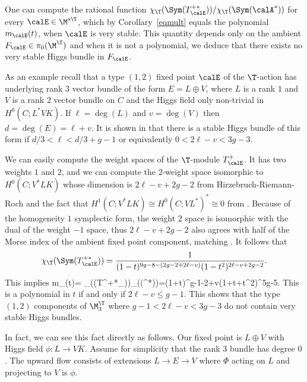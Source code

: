 \begin{remark}
\notready \label{counter}
	One can compute  the rational function ${{ \chi_\T(\Sym(T^{+*}_\calE))/ \chi_\T(\Sym(\calA^*))}}$ for every $\calE\in \M^{s\T}$, which by
	Corollary~\ref{eqmult} equals the polynomial $m_{\calE}(t)$, when $\calE$ is very stable. This quantity depends only on the ambient $F_\calE\in \pi_0(\M^\T)$ and when it is not a polynomial, we  deduce that there exists no very stable Higgs bundle in $F_\calE$.

	As an example recall \cite{gothen} that a type $(1,2)$ fixed point $\calE$ of the $\T$-action has underlying rank $3$ vector bundle of the form $E=L\oplus V$, where $L$ is a rank $1$ and $V$ is a rank $2$ vector bundle on $C$ and
	the Higgs field only non-trivial in $H^0(C;L^{*}VK)$. If $\ell=\deg(L)$ and $v=\deg(V)$ then $d=\deg(E)=\ell+v$. It is shown in \cite[Proposition 2.5]{gothen} that there is a stable Higgs bundle of this form if $ d/3<\ell<d/3+g-1$ or equivalently $0<2\ell-v<3g-3$.

	We can easily compute the weight spaces of the $\T$-module
	$T^+_\calE$. It has two weights $1$ and $2$, and we can compute the $2$-weight space isomorphic to $H^0(C;V^*LK)$ whose dimension is $2\ell-v+2g-2$ from Hirzebruch-Riemann-Roch and the fact that $H^1(C;V^*LK)\cong H^0(C;VL^*)^*\cong 0$ from \cite[proof of Proposition 4.2]{gothen}. Because of the homogeneity $1$ symplectic form,  the weight $2$ space is isomorphic with the dual of the weight $-1$ space, thus $2\ell-v+2g-2$ also agrees with half of the Morse index of the ambient fixed point component, matching \cite[Proposition 4.2.i]{gothen}. It follows that  $$\chi_\T(\Sym(T_\calE^{+*}))={1\over(1-t)^{9g-8-(2g-2+2\ell-v)}(1-t^2)^{2\ell-v+2g-2}}.$$ This implies \beq \label{nonpol}m_\calE(t)={{ \chi_\T(\Sym(T^{+*}_\calE))\over \chi_\T(\Sym(\calA^*))}}=(1+t)^{g-1-2\ell+v}(1+t+t^2)^{5g-5}.\eeq
{}
	This is a polynomial in $t$  if and only if  $2\ell-v\leq g-1$. This shows that the type $(1,2)$ components of $
	\M_3^\T$ where $g-1<2\ell-v<3g-3$ do not contain very stable Higgs bundles.

	In fact, we can see this fact directly as follows. Our fixed point is $L\oplus V$ with Higgs field $\phi:L\rightarrow VK$. Assume for simplicity that the rank $3$ bundle has degree $0$. The upward flow consists of extensions $L\rightarrow E\rightarrow V$ where $\Phi$ acting on $L$ and projecting to $V$ is $\phi$.


\end{remark}
